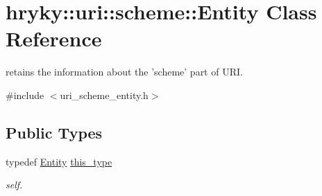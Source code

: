 \hypertarget{classhryky_1_1uri_1_1scheme_1_1_entity}{\section{hryky\-:\-:uri\-:\-:scheme\-:\-:Entity Class Reference}
\label{classhryky_1_1uri_1_1scheme_1_1_entity}
}


retains the information about the 'scheme' part of U\-R\-I.  




{\ttfamily \#include $<$uri\-\_\-scheme\-\_\-entity.\-h$>$}

\subsection*{Public Types}
\begin{DoxyCompactItemize}
\item 
\hypertarget{classhryky_1_1uri_1_1scheme_1_1_entity_aa2f5c1de6e49bee58c948b3534811e03}{typedef \hyperlink{classhryky_1_1uri_1_1scheme_1_1_entity}{Entity} \hyperlink{classhryky_1_1uri_1_1scheme_1_1_entity_aa2f5c1de6e49bee58c948b3534811e03}{this\-\_\-type}}\label{classhryky_1_1uri_1_1scheme_1_1_entity_aa2f5c1de6e49bee58c948b3534811e03}

\begin{DoxyCompactList}\small\item\em self. \end{DoxyCompactList}\end{DoxyCompactItemize}
